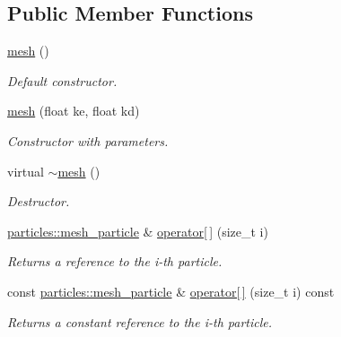 \subsection*{Public Member Functions}
\begin{DoxyCompactItemize}
\item 
\mbox{\label{classphysim_1_1meshes_1_1mesh_a923bdaeba6dff1d95c2e55a80bfb26b5}} 
\hyperlink{classphysim_1_1meshes_1_1mesh_a923bdaeba6dff1d95c2e55a80bfb26b5}{mesh} ()
\begin{DoxyCompactList}\small\item\em Default constructor. \end{DoxyCompactList}\item 
\hyperlink{classphysim_1_1meshes_1_1mesh_a853728b532513cf9fe5f0df25f88358f}{mesh} (float ke, float kd)
\begin{DoxyCompactList}\small\item\em Constructor with parameters. \end{DoxyCompactList}\item 
virtual \hyperlink{classphysim_1_1meshes_1_1mesh_a51250a9f06eabd7cf05c0af7c3d7138c}{$\sim$mesh} ()
\begin{DoxyCompactList}\small\item\em Destructor. \end{DoxyCompactList}\item 
\mbox{\label{classphysim_1_1meshes_1_1mesh_ae238482532e415ee3585765db2427731}} 
\hyperlink{classphysim_1_1particles_1_1mesh__particle}{particles\+::mesh\+\_\+particle} \& \hyperlink{classphysim_1_1meshes_1_1mesh_ae238482532e415ee3585765db2427731}{operator\mbox{[}$\,$\mbox{]}} (size\+\_\+t i)
\begin{DoxyCompactList}\small\item\em Returns a reference to the {\itshape i-\/th} particle. \end{DoxyCompactList}\item 
\mbox{\label{classphysim_1_1meshes_1_1mesh_a37064be55680e2ae0b30fd3fe8cd5816}} 
const \hyperlink{classphysim_1_1particles_1_1mesh__particle}{particles\+::mesh\+\_\+particle} \& \hyperlink{classphysim_1_1meshes_1_1mesh_a37064be55680e2ae0b30fd3fe8cd5816}{operator\mbox{[}$\,$\mbox{]}} (size\+\_\+t i) const
\begin{DoxyCompactList}\small\item\em Returns a constant reference to the {\itshape i-\/th} particle. \end{DoxyCompactList}\item 

\end{DoxyCompactItemize}
